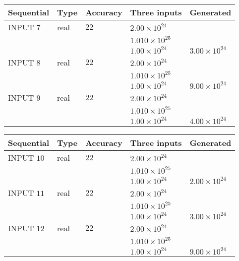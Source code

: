 \documentclass[12pt]{article}
\begin{document}
   
  
  
\noindent\begin{tabular}{|l|l|l|l|l|}
\hline
 Sequential & Type & Accuracy & Three inputs & Generated \\ 
\hline
 
 
  INPUT $            7 $ & real & $           22  $ & $
 2.00 \times 10^{24}
  $ & \\
  & & &  $
 1.010 \times 10^{25}
  $ & \\
  & & &  $
 1.00 \times 10^{24}
 $ & $ 3.00 \times 10^{24} $ 
 \\  \hline  
 
 
  INPUT $            8 $ & real & $           22  $ & $
 2.00 \times 10^{24}
  $ & \\
  & & &  $
 1.010 \times 10^{25}
  $ & \\
  & & &  $
 1.00 \times 10^{24}
 $ & $ 9.00 \times 10^{24} $ 
 \\  \hline  
 
 
  INPUT $            9 $ & real & $           22  $ & $
 2.00 \times 10^{24}
  $ & \\
  & & &  $
 1.010 \times 10^{25}
  $ & \\
  & & &  $
 1.00 \times 10^{24}
 $ & $ 4.00 \times 10^{24} $ 
 \\  \hline  
 \end{tabular}
   
   
  
  
\noindent\begin{tabular}{|l|l|l|l|l|}
\hline
 Sequential & Type & Accuracy & Three inputs & Generated \\ 
\hline
 
 
  INPUT $           10 $ & real & $           22  $ & $
 2.00 \times 10^{24}
  $ & \\
  & & &  $
 1.010 \times 10^{25}
  $ & \\
  & & &  $
 1.00 \times 10^{24}
 $ & $ 2.00 \times 10^{24} $ 
 \\  \hline  
 
 
  INPUT $           11 $ & real & $           22  $ & $
 2.00 \times 10^{24}
  $ & \\
  & & &  $
 1.010 \times 10^{25}
  $ & \\
  & & &  $
 1.00 \times 10^{24}
 $ & $ 3.00 \times 10^{24} $ 
 \\  \hline  
 
 
  INPUT $           12 $ & real & $           22  $ & $
 2.00 \times 10^{24}
  $ & \\
  & & &  $
 1.010 \times 10^{25}
  $ & \\
  & & &  $
 1.00 \times 10^{24}
 $ & $ 9.00 \times 10^{24} $ 
 \\  \hline  
 \end{tabular}
   
\end{document}
